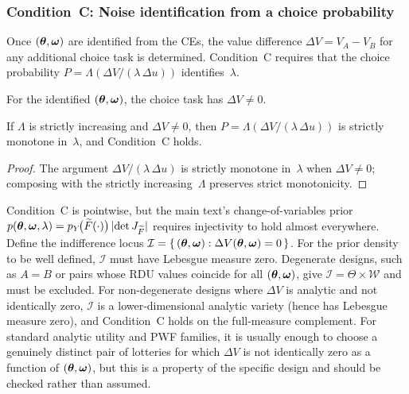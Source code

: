 \subsubsection{Condition~C: Noise identification from a choice probability}
\label{appB:condition_c}

Once $(\boldsymbol{\theta}, \boldsymbol{\omega})$ are identified from the CEs, the value
difference $\Delta V = V_A - V_B$ for any additional choice task
is determined. Condition~C requires that the choice probability
$P = \Lambda(\Delta V / (\lambda\,\Delta u))$ identifies~$\lambda$.

\begin{condition}[C]
\label{cond:C}
For the identified $(\boldsymbol{\theta}, \boldsymbol{\omega})$, the choice task has
$\Delta V \neq 0$.
\end{condition}

\begin{proposition}
\label{prop:noise}
If $\Lambda$ is strictly increasing and $\Delta V \neq 0$, then
$P = \Lambda(\Delta V / (\lambda\,\Delta u))$ is strictly monotone
in~$\lambda$, and Condition~C holds.
\end{proposition}

\begin{proof}
The argument $\Delta V / (\lambda\,\Delta u)$ is strictly monotone
in~$\lambda$ when $\Delta V \neq 0$; composing with the strictly
increasing~$\Lambda$ preserves strict monotonicity.
\end{proof}

Condition~C is pointwise, but the main text's
change-of-variables prior
$p(\boldsymbol{\theta},\boldsymbol{\omega},\lambda)
= p_Y\!\bigl(\widetilde{F}(\cdot)\bigr)\,
\lvert\det J_{\widetilde{F}}\rvert$
requires injectivity to hold almost everywhere. Define the
indifference locus
$\mathcal{I} = \{\,(\boldsymbol{\theta}, \boldsymbol{\omega}) : \Delta V(\boldsymbol{\theta}, \boldsymbol{\omega})
= 0\,\}$. For the prior density to be well defined,
$\mathcal{I}$ must have Lebesgue measure zero.
Degenerate designs, such as $A = B$ or pairs whose RDU values
coincide for all $(\boldsymbol{\theta}, \boldsymbol{\omega})$, give
$\mathcal{I} = \Theta \times \mathcal{W}$ and must be excluded. For
non-degenerate designs where $\Delta V$ is analytic and not
identically zero, $\mathcal{I}$ is a lower-dimensional analytic
variety (hence has Lebesgue measure zero), and Condition~C holds on
the full-measure complement. For standard analytic utility and PWF
families, it is usually enough to choose a genuinely distinct pair of
lotteries for which $\Delta V$ is not identically zero as a function
of $(\boldsymbol{\theta},\boldsymbol{\omega})$, but this is a property of the specific design and
should be checked rather than assumed.

